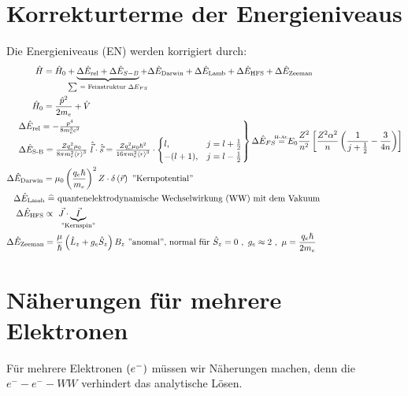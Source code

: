 \documentclass[Ex4_Zusammenfassung.tex]{subfiles}
\begin{document}
\section{Korrekturterme der Energieniveaus}
Die Energieniveaus (EN) werden korrigiert durch:
\begin{align*}
	\hat{H} &= \hat{H}_0 + \underbrace{ \Delta \hat{E}_{\text{rel}} + \Delta \hat{E}_{S-B} }_{\mathclap{\sum\ = \text{ Feinstruktur } \Delta E_{FS}} } + \Delta \hat{E}_{\text{Darwin}} + \Delta \hat{E}_{\text{Lamb}} + \Delta \hat{E}_{\text{HFS}} + \Delta \hat{E}_{\text{Zeeman}}\\
	\hat{H}_0 &= \frac{\hat{p}^2}{2m_e} + \hat{V}\\
	& \kern -3.1em \begin{rcases}
	\Delta \hat{E}_{\text{rel}} = - \frac{p^4}{8 m_e^3 c^2} \\
		\Delta \hat{E}_{\text{S-B}} = \frac{Z q_e^2 \mu_0}{8 \pi m_e^2 \braket{r}^3}\ \hat{\vec{l}} \cdot \hat{\vec{s}} = \frac{Z q_e^2 \mu_0 \hslash^2}{16 \pi m_e^2 \braket{r}^3} \cdot 
			\begin{cases}
				l,&  j=l+\frac{1}{2}\\
				-(l+1) ,& j=l-\frac{1}{2}
			\end{cases} 
	\end{rcases}
	\Delta \hat{E}_{FS} \stackrel{\mathclap{\text{\tiny{H-At.}}}}{=} E_0 \frac{Z^2}{n^2} \left[ \frac{Z^2 \alpha^2}{n} \lp \frac{1}{j+\frac{1}{2}} - \frac{3}{4n} \rp  \right] \\
	\Delta \hat{E}_{\text{Darwin}} &= \mu_0 \lp \frac{q_e \hslash}{m_e} \rp^2 Z \cdot \delta\lp \vec{r} \rp\  \text{''Kernpotential''}\\
	& \kern -3.4em \Delta \hat{E}_{\text{Lamb}}\  \widehat{=} \text{ quantenelektrodynamische Wechselwirkung (WW) mit dem Vakuum}\\
	& \kern -3.1em \Delta \hat{E}_{\text{HFS}} \propto\ \vec{J} \cdot \underbrace{\vec{I}}_{\mathclap{\text{''Kernspin''}}}\\
	& \kern -4.2em \Delta \hat{E}_{\text{Zeeman}} = \frac{\mu}{\hslash} \lp \hat{L}_z + g_e \hat{S}_z \rp B_z\ \text{''anomal'', normal für } \hat{S}_z = 0\ ,\ g_e \approx 2\ ,\ \mu = \frac{q_e \hslash}{2m_e}
\end{align*}

\section{Näherungen für mehrere Elektronen}
Für mehrere Elektronen $ \left( e^- \right) $ müssen wir Näherungen machen, denn die $ e^- - e^- - WW$ verhindert das analytische Lösen. \\
\end{document}
